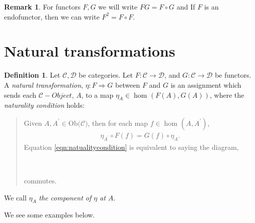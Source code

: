 \documentclass[11pt,a4paper]{article}
\theoremstyle{definition}
\newtheorem{definition}[thm]{Definition}
\newtheorem{remark}[thm]{Remark}
\newcommand\ho[3][]{\hom_{#1}(#2,#3)}
\newcommand\ob[1]{\mathrm{Ob(}#1\mathrm{)}}
\newcommand\cat[1]{\mathscr{#1}}
\numberwithin{equation}{section}
\begin{document}
\begin{remark}
For functors $F, G$ we will write $FG=F\circ G$ and If $F$ is an endofunctor, then we can write $F^{2}=F\circ F$.
\end{remark}

\pagebreak
\section{Natural transformations}
\label{s:naturaltransformations} 
\begin{definition}
\label{def:naturaltransformation}
Let $\mathscr{C},\mathscr{D}$ be categories. Let $F\colon\mathscr{C}\rightarrow \mathscr{D}$, and $G\colon\mathscr{C}\rightarrow \mathscr{D}$ be functors. A \emph{natural transformation}, $\eta\colon F\Rightarrow G$ between $F$ and $G$ is an assignment which sends each $\mathscr{C}-Object$, $A$, to a map $\eta_{A}\in\ho{F(A)}{G(A)}$, where the \emph{naturality condition} holds: 

\begin{quotation}
Given $A,A^{\prime}\in\ob{\cat{C}}$, then for each map $f\in\ho{A}{A^{\prime}}$,
\begin{align}
\label{eqn:natualitycondition}
    \eta_{A^{\prime}} \circ F(f) = G(f) \circ \eta_{A}.
\end{align}
Equation \ref{eqn:natualitycondition} is equivalent to saying the diagram,\\
\begin{center}
\\
\end{center}
commutes.
\end{quotation}
We call $\eta_{A}$ \emph{the component of $\eta$ at $A$}.
\end{definition}
We see some examples below.
\end{document}

